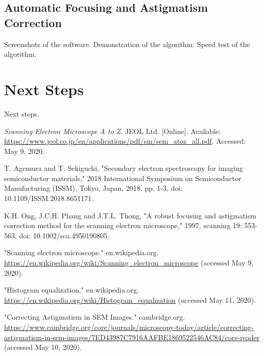 \documentclass{article}
\begin{document}
\subsection{Automatic Focusing and Astigmatism Correction}
Screenshots of the software.
Demonstration of the algorithm.
Speed test of the algorithm.

\section{Next Steps}
Next steps.

\newpage
\begin{thebibliography}{}
    \textit{Scanning Electron Microscope A to Z}. JEOL Ltd. [Online]. Available: \url{https://www.jeol.co.jp/en/applications/pdf/sm/sem_atoz_all.pdf}. Accessed: May 9, 2020.

    T. Agemura and T. Sekiguchi, "Secondary electron spectroscopy for imaging semiconductor materials," 2018 International Symposium on Semiconductor Manufacturing (ISSM), Tokyo, Japan, 2018, pp. 1-3, doi: 10.1109/ISSM.2018.8651171.

    K.H. Ong, J.C.H. Phang and J.T.L. Thong, "A robust focusing and astigmatism correction method for the scanning electron microscope," 1997, scanning 19: 553-563, doi: 10.1002/sca.4950190805.
    
    "Scanning electron microscope." en.wikipedia.org. \url{https://en.wikipedia.org/wiki/Scanning_electron_microscope} (accessed May 9, 2020).

    "Histogram equalization." en.wikipedia.org. \url{https://en.wikipedia.org/wiki/Histogram_equalization} (accessed May 11, 2020).

    "Correcting Astigmatism in SEM Images." cambridge.org. \url{https://www.cambridge.org/core/journals/microscopy-today/article/correcting-astigmatism-in-sem-images/7ED43987C7916AAFBE1869522546AC84/core-reader} (accessed May 10, 2020).
\end{thebibliography}
\end{document}
